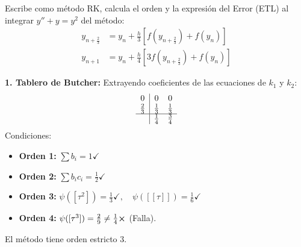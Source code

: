 \begin{ejer}[5.7.4] 
Escribe como m\'etodo RK, calcula el orden y la expresión del Error (ETL) al integrar $y'' + y = y^2$ del m\'etodo:
\begin{align*}
y_{n+\frac{2}{3}} &= y_n + \frac{h}{3} \left[ f(y_{n+\frac{2}{3}}) + f(y_n) \right] \\
y_{n+1} &= y_n + \frac{h}{4} \left[ 3f(y_{n+\frac{2}{3}}) + f(y_n) \right]
\end{align*}
\end{ejer}
\begin{sol}
\textbf{1. Tablero de Butcher:}
Extrayendo coeficientes de las ecuaciones de $k_1$ y $k_2$:
\[
\begin{array}{c|cc}
0           & 0          & 0          \\
\frac{2}{3} & \frac{1}{3}& \frac{1}{3} \\ \hline
            & \frac{1}{4}& \frac{3}{4}
\end{array}
\]
Condiciones:
\begin{itemize}
    \item \textbf{Orden 1:} $\sum b_i = 1 \checkmark$
    \item \textbf{Orden 2:} $\sum b_i c_i = \frac{1}{2} \checkmark$
    \item \textbf{Orden 3:} $\psi([\tau^2]) = \frac{1}{3} \checkmark, \quad \psi([[\tau]]) = \frac{1}{6} \checkmark$
    \item \textbf{Orden 4:} $\psi([\tau^3]) = \frac{2}{9} \neq \frac{1}{4} \cross$ (Falla).
\end{itemize}
El método tiene orden estricto 3.
\end{sol}




